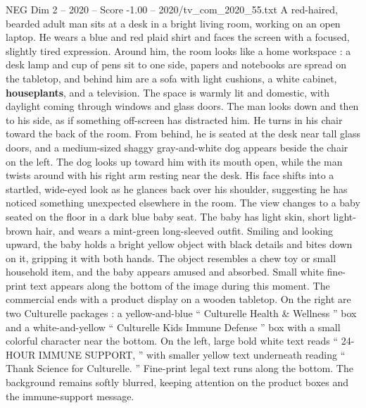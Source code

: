 \begin{textsample}{NEG Dim 2 – 2020 – Score -1.00 – 2020/tv\_com\_2020\_55.txt}  \label{ex:f2_neg_051}
A red-haired, bearded adult man sits at a desk in a bright living room, working on an open laptop.
He wears a blue and red plaid shirt and faces the screen with a focused, slightly tired expression.
Around him, the room looks like a home workspace : a desk lamp and cup of pens sit to one side, papers and notebooks are spread on the tabletop, and behind him are a sofa with light cushions, a white cabinet, \textbf{houseplants}, and a television.
The space is warmly lit and domestic, with daylight coming through windows and glass doors.
The man looks down and then to his side, as if something off-screen has distracted him.
He turns in his chair toward the back of the room.
From behind, he is seated at the desk near tall glass doors, and a medium-sized shaggy gray-and-white dog appears beside the chair on the left.
The dog looks up toward him with its mouth open, while the man twists around with his right arm resting near the desk.
His face shifts into a startled, wide-eyed look as he glances back over his shoulder, suggesting he has noticed something unexpected elsewhere in the room.
The view changes to a baby seated on the floor in a dark blue baby seat.
The baby has light skin, short light-brown hair, and wears a mint-green long-sleeved outfit.
Smiling and looking upward, the baby holds a bright yellow object with black details and bites down on it, gripping it with both hands.
The object resembles a chew toy or small household item, and the baby appears amused and absorbed.
Small white fine-print text appears along the bottom of the image during this moment.
The commercial ends with a product display on a wooden tabletop.
On the right are two Culturelle packages : a yellow-and-blue “ Culturelle Health \& Wellness ” box and a white-and-yellow “ Culturelle Kids Immune Defense ” box with a small colorful character near the bottom.
On the left, large bold white text reads “ 24-HOUR IMMUNE SUPPORT, ” with smaller yellow text underneath reading “ Thank Science for Culturelle. ” Fine-print legal text runs along the bottom.
The background remains softly blurred, keeping attention on the product boxes and the immune-support message.

\end{textsample}
